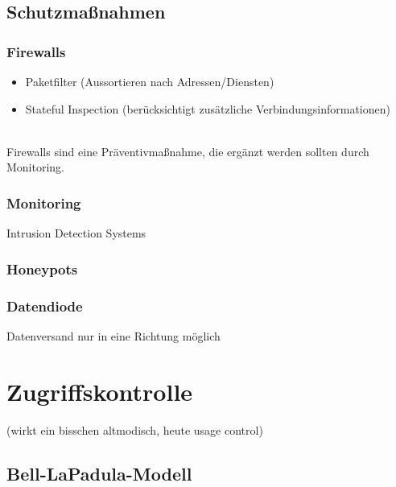 \documentclass[a4paper,twoside,DIV15,BCOR12mm]{scrbook}
\begin{document}
\section{Schutzmaßnahmen}

\subsection{Firewalls}

\begin{itemize}
	\item Paketfilter (Aussortieren nach Adressen/Diensten)
	\item Stateful Inspection (berücksichtigt zusätzliche Verbindungsinformationen)
\end{itemize}

\\

Firewalls sind eine Präventivmaßnahme, die ergänzt werden sollten durch Monitoring.

\subsection{Monitoring}

Intrusion Detection Systems

\subsection{Honeypots}

\subsection{Datendiode}

Datenversand nur in eine Richtung möglich\\



\chapter{Zugriffskontrolle}

(wirkt ein bisschen altmodisch, heute usage control)

\section{Bell-LaPadula-Modell}
\end{document}
